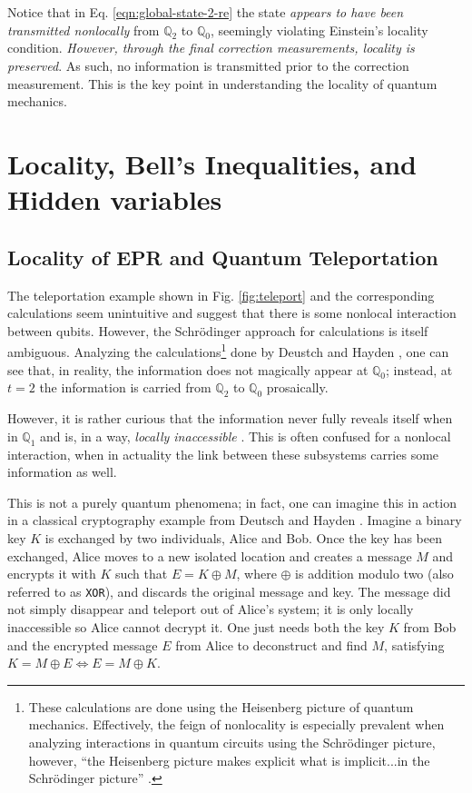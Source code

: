 \documentclass[%
 aip,
cp,  %
 amsmath,amssymb,%
 reprint,%
]{revtex4-2}
\newcommand{\Q}{\mathbb{Q}}
\begin{document}
    Notice that in Eq. \eqref{eqn:global-state-2-re} the state \textit{appears to have been transmitted nonlocally} from $\Q_2$ to $\Q_0$, seemingly violating Einstein's locality condition. \textit{However, through the final correction measurements, locality is preserved}. As such, no information is transmitted prior to the correction measurement. This is the key point in understanding the locality of quantum mechanics.

\section{Locality, Bell's Inequalities, and Hidden variables}
    \subsection{Locality of EPR and Quantum Teleportation}
    The teleportation example shown in Fig. \ref{fig:teleport} and the corresponding calculations seem unintuitive and suggest that there is some nonlocal interaction between qubits. However, the Schr{\"o}dinger approach for calculations is itself ambiguous. Analyzing the calculations\footnote{These calculations are done using the Heisenberg picture of quantum mechanics. Effectively, the feign of nonlocality is especially prevalent when analyzing interactions in quantum circuits using the Schr{\"o}dinger picture, however, ``the Heisenberg picture makes explicit what is implicit...in the Schr{\"o}dinger picture'' \cite[p. 23]{Deutsch_2000}.} done by Deustch and Hayden \cite{Deutsch_2000}, one can see that, in reality, the information does not magically appear at $\Q_0$; instead, at $t=2$ the information is carried from $\Q_2$ to $\Q_0$ prosaically.

    However, it is rather curious that the information never fully reveals itself when in $\Q_1$ and is, in a way, \textit{locally inaccessible} \cite{Deutsch_2000}. This is often confused for a nonlocal interaction, when in actuality the link between these subsystems carries some information as well. 
    
    This is not a purely quantum phenomena; in fact, one can imagine this in action in a classical cryptography example from Deutsch and Hayden \cite{Deutsch_2000}. Imagine a binary key $K$ is exchanged by two individuals, Alice and Bob. Once the key has been exchanged, Alice moves to a new isolated location and creates a message $M$ and encrypts it with $K$ such that $E = K\oplus M$, where $\oplus$ is addition modulo two (also referred to as \texttt{XOR}), and discards the original message and key. The message did not simply disappear and teleport out of Alice's system; it is only locally inaccessible so Alice cannot decrypt it. One just needs both the key $K$ from Bob and the encrypted message $E$ from Alice to deconstruct and find $M$, satisfying $K = M\oplus E \iff E = M\oplus K$.
    
\end{document}
